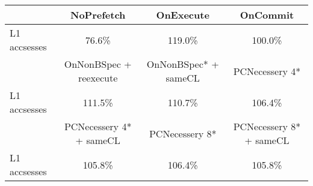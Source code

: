 \begin{tabular}{ l|ccc }
 & NoPrefetch & OnExecute & OnCommit\\ \hline
L1 accsesses & 76.6\% & 119.0\% & 100.0\%\\ \hline
\hline
 & OnNonBSpec + reexecute & OnNonBSpec* + sameCL & PCNecessery 4*\\ \hline
L1 accsesses & 111.5\% & 110.7\% & 106.4\%\\ \hline
\hline
 & PCNecessery 4* + sameCL & PCNecessery 8* & PCNecessery 8* + sameCL\\ \hline
L1 accsesses & 105.8\% & 106.4\% & 105.8\%\\ \hline
\end{tabular}

